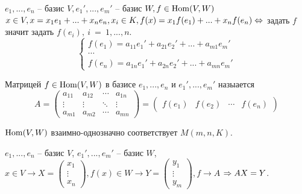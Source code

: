 
$e_1, ..., e_n$ -- базис $V, e_1', ..., e_m'$ -- базис $W, f \in \operatorname{Hom} (V, W)$ \\
$x \in V, x = x_1 e_1 + ... + x_n e_n, x_i \in K, f(x) = x_1 f(e_1) + ... + x_n f(e_n) \Leftrightarrow$ задать $f$ значит задать $f(e_i),~i~=~1, ..., n$. \\


\[\begin{cases}
	f(e_1) = a_{11} e_1' + a_{21} e_2' + ... + a_{m1} e_m' \\
	\cdots \\
	f(e_n) = a_{1n} e_1' + a_{2n} e_2' + ... + a_{mn} e_m'
\end{cases}\]

\begin{Def}
	Матрицей $f \in \operatorname{Hom}(V, W)$ в базисе $e_1, ..., e_n$ и $e_1', ..., e_m'$ назыается 
	\[A=\left(\begin{array}{cccc}
	a_{11} & a_{12} & \cdots & a_{1n} \\ 
	\vdots & \vdots & \ddots & \vdots \\ 
	a_{m1} & a_{m2} & \cdots & a_{mn}
	\end{array}\right) = \left(\begin{array}{cccc}
	f(e_1) & f(e_2) & \cdots & f(e_n)
	\end{array}\right)\]
\end{Def}

\begin{Thm}
	\begin{MyList}
		\item $\operatorname{Hom}(V, W)$ взаимно-однозначно соответствует $M(m, n, K)$.
		\item $e_1, ..., e_n$ -- базис $V$, $e_1', ..., e_m'$ -- базис $W$, $x \in V \to X = \begin{pmatrix}
		x_1 \\ 
		\vdots \\ 
		x_n
		\end{pmatrix}, f(x) \in W \to Y = \begin{pmatrix}
		y_1 \\ 
		\vdots \\ 
		y_m
		\end{pmatrix}, f \to A$
		$\Rightarrow AX = Y$.  
	\end{MyList}
\end{Thm}

